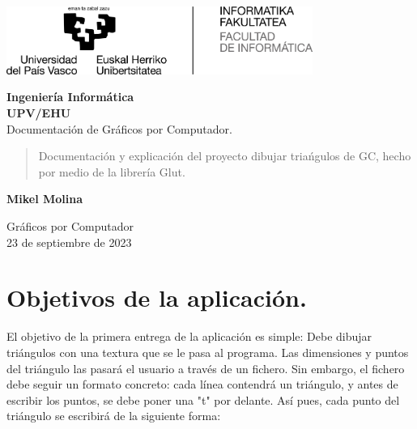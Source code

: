 \documentclass[12pt,a4paper]{article}
\begin{document}
\renewcommand*\contentsname{Índice}
\begin{titlepage}
	\begin{center}
	\vspace*{-4cm}	
       \begin{minipage}{\textwidth}
	   \centering
	   \includegraphics[width=100mm]{ehu.jpg}
	   \vspace*{4cm}
       \end{minipage}
       \vspace*{0.5cm}

	

       \textbf{Ingeniería Informática}\\
       \textbf{UPV/EHU}\\

       \vspace{0.5cm}
        Documentación de Gráficos por Computador.
            
       \vspace{1.5cm}

       
		\begin{abstract}
			\centering
			Documentación y explicación del proyecto dibujar triańgulos de GC, hecho por medio de la librería Glut.
		\end{abstract}
       \vfill 
            
       
            \textbf{Mikel Molina}
       \vspace{0.8cm}
     
            
       Gráficos por Computador\\
       23 de septiembre de 2023 
   \end{center}
            
\end{titlepage}
\tableofcontents
\clearpage
\section{Objetivos de la aplicación.}
El objetivo de la primera entrega de la aplicación es simple: Debe dibujar triángulos con una textura que se le pasa al programa. Las dimensiones y puntos del triángulo las pasará el usuario a través de un fichero. Sin embargo, el fichero debe seguir un formato concreto: cada línea contendrá un triángulo, y antes de escribir los puntos, se debe poner una "t" por delante. Así pues, cada punto del triángulo se escribirá de la siguiente forma:
\end{document}
